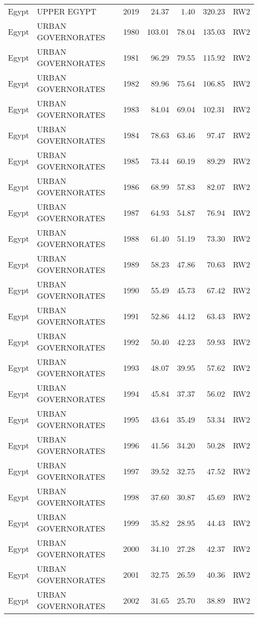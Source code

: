 \begin{longtable}{lllrrrl}
  Egypt & UPPER EGYPT & 2019 & 24.37 & 1.40 & 320.23 & RW2 \\ 
  Egypt & URBAN GOVERNORATES & 1980 & 103.01 & 78.04 & 135.03 & RW2 \\ 
  Egypt & URBAN GOVERNORATES & 1981 & 96.29 & 79.55 & 115.92 & RW2 \\ 
  Egypt & URBAN GOVERNORATES & 1982 & 89.96 & 75.64 & 106.85 & RW2 \\ 
  Egypt & URBAN GOVERNORATES & 1983 & 84.04 & 69.04 & 102.31 & RW2 \\ 
  Egypt & URBAN GOVERNORATES & 1984 & 78.63 & 63.46 & 97.47 & RW2 \\ 
  Egypt & URBAN GOVERNORATES & 1985 & 73.44 & 60.19 & 89.29 & RW2 \\ 
  Egypt & URBAN GOVERNORATES & 1986 & 68.99 & 57.83 & 82.07 & RW2 \\ 
  Egypt & URBAN GOVERNORATES & 1987 & 64.93 & 54.87 & 76.94 & RW2 \\ 
  Egypt & URBAN GOVERNORATES & 1988 & 61.40 & 51.19 & 73.30 & RW2 \\ 
  Egypt & URBAN GOVERNORATES & 1989 & 58.23 & 47.86 & 70.63 & RW2 \\ 
  Egypt & URBAN GOVERNORATES & 1990 & 55.49 & 45.73 & 67.42 & RW2 \\ 
  Egypt & URBAN GOVERNORATES & 1991 & 52.86 & 44.12 & 63.43 & RW2 \\ 
  Egypt & URBAN GOVERNORATES & 1992 & 50.40 & 42.23 & 59.93 & RW2 \\ 
  Egypt & URBAN GOVERNORATES & 1993 & 48.07 & 39.95 & 57.62 & RW2 \\ 
  Egypt & URBAN GOVERNORATES & 1994 & 45.84 & 37.37 & 56.02 & RW2 \\ 
  Egypt & URBAN GOVERNORATES & 1995 & 43.64 & 35.49 & 53.34 & RW2 \\ 
  Egypt & URBAN GOVERNORATES & 1996 & 41.56 & 34.20 & 50.28 & RW2 \\ 
  Egypt & URBAN GOVERNORATES & 1997 & 39.52 & 32.75 & 47.52 & RW2 \\ 
  Egypt & URBAN GOVERNORATES & 1998 & 37.60 & 30.87 & 45.69 & RW2 \\ 
  Egypt & URBAN GOVERNORATES & 1999 & 35.82 & 28.95 & 44.43 & RW2 \\ 
  Egypt & URBAN GOVERNORATES & 2000 & 34.10 & 27.28 & 42.37 & RW2 \\ 
  Egypt & URBAN GOVERNORATES & 2001 & 32.75 & 26.59 & 40.36 & RW2 \\ 
  Egypt & URBAN GOVERNORATES & 2002 & 31.65 & 25.70 & 38.89 & RW2 \\ 

\end{longtable}
